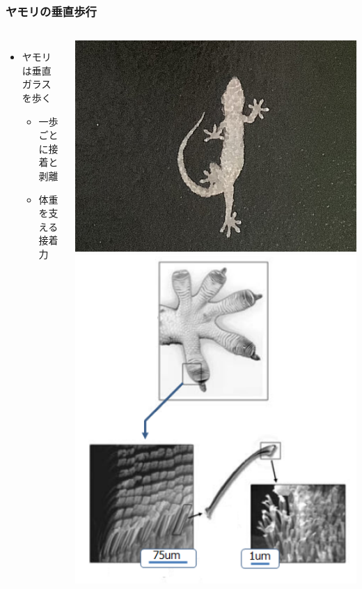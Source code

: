 \documentclass[unicode,12pt]{beamer}%
\begin{document}
\begin{frame}
	\frametitle{ヤモリの垂直歩行}
	\begin{columns}[T, onlytextwidth]
		\begin{itemize}
			\item ヤモリは垂直ガラスを歩く
			\begin{itemize}
				\item 一歩ごとに接着と剥離
				\item 体重を支える接着力
			\end{itemize}
		\end{itemize}
		\centering
		\includegraphics[width=\textwidth]{gekko_glass.jpg}
		\centering
		\includegraphics[width=\textwidth]{gekko2.png}


\end{columns}
\end{frame}
\end{document}
